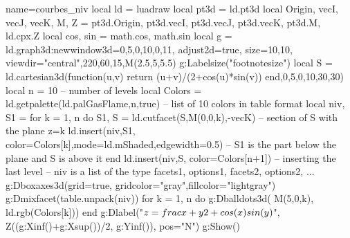 \begin{luadraw}{name=courbes_niv}
local ld = luadraw
local pt3d = ld.pt3d
local Origin, vecI, vecJ, vecK, M, Z = pt3d.Origin, pt3d.vecI, pt3d.vecJ, pt3d.vecK, pt3d.M, ld.cpx.Z
local cos, sin = math.cos, math.sin
local g = ld.graph3d:new{window3d={0,5,0,10,0,11}, adjust2d=true, size={10,10},
    viewdir={"central",220,60,15,M(2.5,5,5.5)}}
g:Labelsize("footnotesize")
local S = ld.cartesian3d(function(u,v) return (u+v)/(2+cos(u)*sin(v)) end,0,5,0,10,{30,30})
local n = 10 -- number of levels
local Colors = ld.getpalette(ld.palGasFlame,n,true) -- list of 10 colors in table format
local niv, S1 = {}
for k = 1, n do
    S1, S = ld.cutfacet(S,{M(0,0,k),-vecK}) -- section of S with the plane z=k
    ld.insert(niv,{S1, {color=Colors[k],mode=ld.mShaded,edgewidth=0.5}}) -- S1 is the part below the plane and S is above it
end
ld.insert(niv,{S, {color=Colors[n+1]}}) -- inserting the last level
-- niv is a list of the type {facets1, options1, facets2, options2, ...}
g:Dboxaxes3d({grid=true, gridcolor="gray",fillcolor="lightgray"})
g:Dmixfacet(table.unpack(niv))
for k = 1, n do
    g:Dballdots3d( M(5,0,k), ld.rgb(Colors[k]))
end
g:Dlabel("$z=\\frac{x+y}{2+\\cos(x)\\sin(y)}$", Z((g:Xinf()+g:Xsup())/2, g:Yinf()), {pos="N"})
g:Show()
\end{luadraw}
